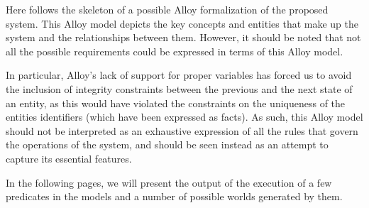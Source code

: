 Here follows the skeleton of a possible Alloy formalization of the proposed system.
This Alloy model depicts the key concepts and entities that make up the system and the relationships between them.
However, it should be noted that not all the possible requirements could be expressed in terms of this Alloy model.

In particular, Alloy's lack of support for proper variables has forced us to avoid the inclusion of integrity constraints between the previous and the next state of an entity, as this would have violated the constraints on the uniqueness of the entities identifiers (which have been expressed as facts). 
As such, this Alloy model should not be interpreted as an exhaustive expression of all the rules that govern the operations of the system, and should be seen instead as an attempt to capture its essential features.


\pagebreak
In the following pages, we will present the output of the execution of a few predicates in the models and a number of possible worlds generated by them.
\begin{figure}[H]
\centering
{}
\end{figure}

\begin{landscape}
%
\end{landscape}

\begin{landscape}
%
\end{landscape}

\begin{landscape}
%
\end{landscape}

